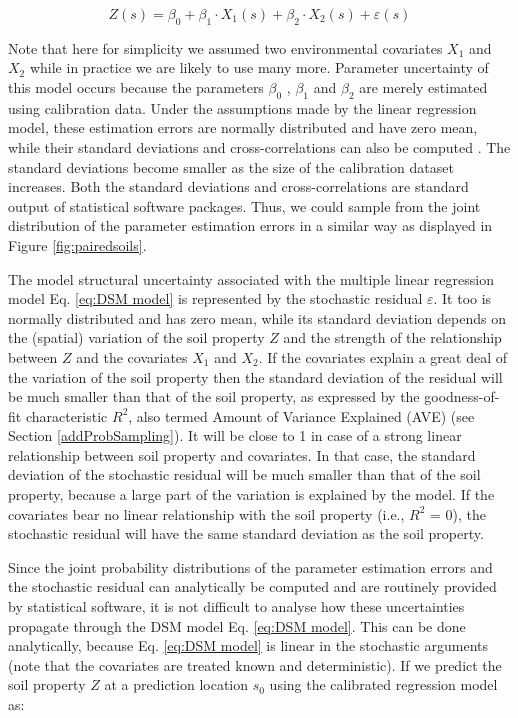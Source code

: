 \documentclass[10pt,b5paper,]{book}
\theoremstyle{definition}
\theoremstyle{definition}
\theoremstyle{definition}
\theoremstyle{remark}
\begin{document}
\begin{equation}
\label{eq:DSM model}
Z(s) = \beta_0 + \beta_1  \cdot X_1 (s) + \beta_2 \cdot X_2 (s) + \varepsilon(s)
\end{equation}

Note that here for simplicity we assumed two environmental covariates
\({X_1}\) and \({X_2}\) while in practice we are likely to use many
more. Parameter uncertainty of this model occurs because the parameters
\({\beta_0}\) , \({\beta_1}\) and \({\beta_2}\) are merely estimated
using calibration data. Under the assumptions made by the linear
regression model, these estimation errors are normally distributed and
have zero mean, while their standard deviations and cross-correlations
can also be computed \citep[Section 17.5]{snedecor1989stadistical}. The
standard deviations become smaller as the size of the calibration
dataset increases. Both the standard deviations and cross-correlations
are standard output of statistical software packages. Thus, we could
sample from the joint distribution of the parameter estimation errors in
a similar way as displayed in Figure \ref{fig:pairedsoils}.

The model structural uncertainty associated with the multiple linear
regression model Eq. \ref{eq:DSM model} is represented by the stochastic
residual \({\varepsilon}\). It too is normally distributed and has zero
mean, while its standard deviation depends on the (spatial) variation of
the soil property \(Z\) and the strength of the relationship between
\(Z\) and the covariates \({X_1}\) and \({X_2}\). If the covariates
explain a great deal of the variation of the soil property then the
standard deviation of the residual will be much smaller than that of the
soil property, as expressed by the goodness-of-fit characteristic
\({R^2}\), also termed Amount of Variance Explained (AVE) (see Section
\ref{addProbSampling}). It will be close to 1 in case of a strong linear
relationship between soil property and covariates. In that case, the
standard deviation of the stochastic residual will be much smaller than
that of the soil property, because a large part of the variation is
explained by the model. If the covariates bear no linear relationship
with the soil property (i.e., \({R^2}\) = 0), the stochastic residual
will have the same standard deviation as the soil property.

Since the joint probability distributions of the parameter estimation
errors and the stochastic residual can analytically be computed and are
routinely provided by statistical software, it is not difficult to
analyse how these uncertainties propagate through the DSM model Eq.
\ref{eq:DSM model}. This can be done analytically, because Eq.
\ref{eq:DSM model} is linear in the stochastic arguments (note that the
covariates are treated known and deterministic). If we predict the soil
property \(Z\) at a prediction location \({s_0}\) using the calibrated
regression model as:
\end{document}
